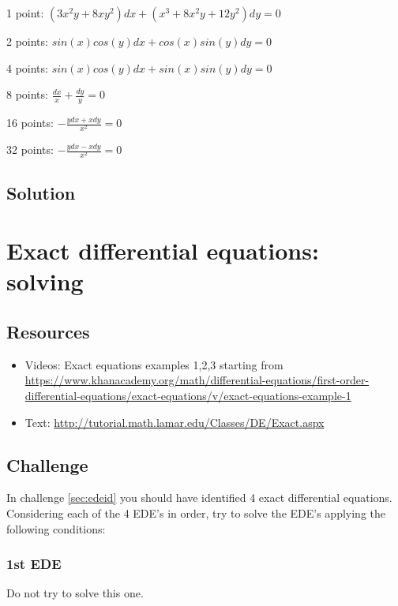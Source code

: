 1 point: $\displaystyle (3x^2y+8xy^2) dx + (x^3 + 8x^2y + 12 y^2) dy = 0$ %

2 points: $\displaystyle sin(x) cos(y) dx + cos(x) sin(y) dy = 0$ %

4 points: $\displaystyle sin(x) cos(y) dx + sin(x) sin(y) dy = 0$ %

8 points: $\displaystyle \frac{dx}{x} + \frac{dy}{y} = 0$ %

16 points: $\displaystyle -\frac{y dx + x dy}{x^2} = 0 $ %

32 points: $\displaystyle -\frac{y dx - x dy}{x^2} = 0$ %


\subsection*{Solution}
\six{}





\newpage
\section{Exact differential equations: solving}

\subsection*{Resources}
\begin{itemize}
    \item Videos: Exact equations examples 1,2,3 starting from \url{https://www.khanacademy.org/math/differential-equations/first-order-differential-equations/exact-equations/v/exact-equations-example-1}
    \item Text: \url{http://tutorial.math.lamar.edu/Classes/DE/Exact.aspx}
\end{itemize}

\subsection*{Challenge}
In challenge \ref{sec:edeid} you should have identified 4 exact differential equations. Considering each of the 4 EDE's in order, try to solve the EDE's applying the following conditions:

\subsubsection{1st EDE}
Do not try to solve this one.

